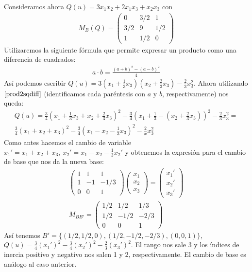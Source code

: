 \documentclass[14pt]{book}
\begin{document}
\begin{ej}
	Consideramos ahora $Q(u) = 3x_1x_2 + 2x_1x_3 + x_2x_3$ con
	\begin{align*}
		M_B(Q) = \left(\begin{array}{ccc}
		0 & 3/2 & 1 \\
		3/2 & 9 & 1/2 \\
		1 & 1/2 & 0
		\end{array}\right)
	\end{align*}
	Utilizaremos la siguiente fórmula que permite expresar un producto como una diferencia de cuadrados:
	\begin{align}
		\label{prod2sqdiff}
		a\cdot b = \frac{(a + b)^2 - (a - b)^2}{4}
	\end{align}
	Así podemos escribir $Q(u) = 3(x_1 + \frac{1}{3}x_3)(x_2 + \frac{2}{3}x_3) - \frac{2}{3}x_3^2$. Ahora utilizando $\eqref{prod2sqdiff}$ (identificamos cada paréntesis con $a$ y $b$, respectivamente) nos queda:
	\begin{align*}
		Q(u) = \frac{3}{4}(x_1 + \frac{1}{3}x_3 + x_2 + \frac{2}{3}x_3)^2 - \frac{3}{4}(x_1 + \frac{1}{3} - (x_2 + \frac{2}{3}x_3))^2 - \frac{2}{3}x_3^2 = \\
		\frac{3}{4}(x_1 + x_2 + x_3)^2 - \frac{3}{4}(x_1 - x_2 - \frac{1}{3}x_3)^2 - \frac{2}{x}x_3^2
	\end{align*}
	Como antes hacemos el cambio de variable $x_1' = x_1 + x_2 + x_3,\ x_2' = x_1 - x_2 - \frac{1}{3}x_2'$ y obtenemos la expresión para el cambio de base que nos da la nueva base:
	\begin{align*}
		\left(\begin{array}{ccc}
		1 & 1 & 1 \\ 1 & -1 & -1/3 \\ 0 & 0 & 1
		\end{array}\right)\left(\begin{array}{c}
			x_1 \\ x_2 \\ x_3
		\end{array}\right) = 
		\left(\begin{array}{c}
		x_1' \\ x_2' \\ x_3'
		\end{array}\right) \\
		M_{BB'} = \left(\begin{array}{ccc}
		1/2 & 1/2 & 1/3 \\ 1/2 & -1/2 & -2/3 \\ 0 & 0 & 1
		\end{array}\right)
	\end{align*}
	Así tenemos $B' = \{(1/2, 1/2, 0), (1/2, -1/2, -2/3), (0, 0, 1)\}$, $Q(u) = \frac{3}{4}(x_1')^2 - \frac{3}{4}(x_2')^2 - \frac{2}{3}(x_3')^2$. El rango nos sale 3 y los índices de inercia positivo y negativo nos salen 1 y 2, respectivamente. El cambio de base es análogo al caso anterior.
\end{ej}
\end{document}
